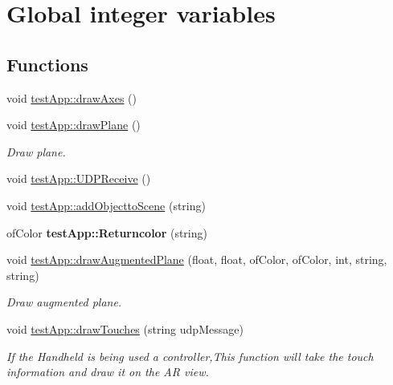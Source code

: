 \hypertarget{group___int_variables}{\section{Global integer variables}
\label{group___int_variables}
}
\subsection*{Functions}
\begin{DoxyCompactItemize}
\item 
void \hyperlink{group___int_variables_gaa2fcbae31171ba366d4c0fcaf44149f4}{test\-App\-::draw\-Axes} ()
\item 
void \hyperlink{group___int_variables_ga47747729f6d0d84c36ef0ec9fca01303}{test\-App\-::draw\-Plane} ()
\begin{DoxyCompactList}\small\item\em Draw plane. \end{DoxyCompactList}\item 
void \hyperlink{group___int_variables_gae18e12d5025a2167ebd63ca019468cc0}{test\-App\-::\-U\-D\-P\-Receive} ()
\item 
void \hyperlink{group___int_variables_gaa1d58aa9130d8d7526eb407f13f7a833}{test\-App\-::add\-Objectto\-Scene} (string)
\item 
\hypertarget{group___int_variables_ga689f3b0cf0b38217152da7f5ce0d609f}{of\-Color {\bfseries test\-App\-::\-Returncolor} (string)}\label{group___int_variables_ga689f3b0cf0b38217152da7f5ce0d609f}

\item 
void \hyperlink{group___int_variables_ga34646de458b0af33bc02457c9b8583df}{test\-App\-::draw\-Augmented\-Plane} (float, float, of\-Color, of\-Color, int, string, string)
\begin{DoxyCompactList}\small\item\em Draw augmented plane. \end{DoxyCompactList}\item 
void \hyperlink{group___int_variables_ga16036c3aa23c1747e315a3e18105cf45}{test\-App\-::draw\-Touches} (string udp\-Message)
\begin{DoxyCompactList}\small\item\em If the Handheld is being used a controller,This function will take the touch information and draw it on the A\-R view. \end{DoxyCompactList}\end{DoxyCompactItemize}
